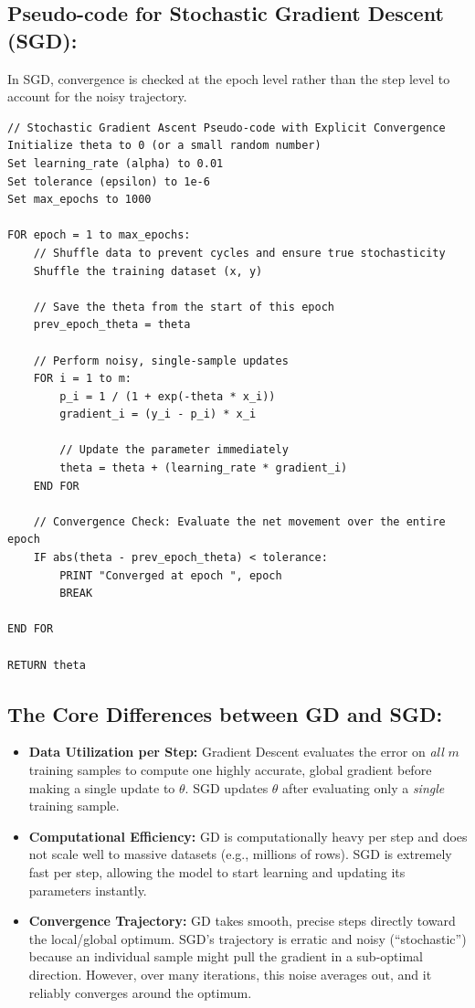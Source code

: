 \documentclass[twoside, 10pt]{article}
\begin{document}
\subsection{Pseudo-code for Stochastic Gradient Descent (SGD):}
In SGD, convergence is checked at the epoch level rather than the step level to account for the noisy trajectory.
\begin{verbatim}
// Stochastic Gradient Ascent Pseudo-code with Explicit Convergence
Initialize theta to 0 (or a small random number)
Set learning_rate (alpha) to 0.01
Set tolerance (epsilon) to 1e-6
Set max_epochs to 1000

FOR epoch = 1 to max_epochs:
    // Shuffle data to prevent cycles and ensure true stochasticity
    Shuffle the training dataset (x, y)
    
    // Save the theta from the start of this epoch
    prev_epoch_theta = theta
    
    // Perform noisy, single-sample updates
    FOR i = 1 to m:
        p_i = 1 / (1 + exp(-theta * x_i))
        gradient_i = (y_i - p_i) * x_i
        
        // Update the parameter immediately
        theta = theta + (learning_rate * gradient_i)
    END FOR
    
    // Convergence Check: Evaluate the net movement over the entire epoch
    IF abs(theta - prev_epoch_theta) < tolerance:
        PRINT "Converged at epoch ", epoch
        BREAK
        
END FOR

RETURN theta
\end{verbatim}
\subsection*{The Core Differences between GD and SGD:}
\begin{itemize}
    \item \textbf{Data Utilization per Step:} Gradient Descent evaluates the error on \textit{all} $m$ training samples to compute one highly accurate, global gradient before making a single update to $\theta$. SGD updates $\theta$ after evaluating only a \textit{single} training sample. 
    \item \textbf{Computational Efficiency:} GD is computationally heavy per step and does not scale well to massive datasets (e.g., millions of rows). SGD is extremely fast per step, allowing the model to start learning and updating its parameters instantly.
    \item \textbf{Convergence Trajectory:} GD takes smooth, precise steps directly toward the local/global optimum. SGD's trajectory is erratic and noisy (``stochastic'') because an individual sample might pull the gradient in a sub-optimal direction. However, over many iterations, this noise averages out, and it reliably converges around the optimum.
\end{itemize}
\end{document}
